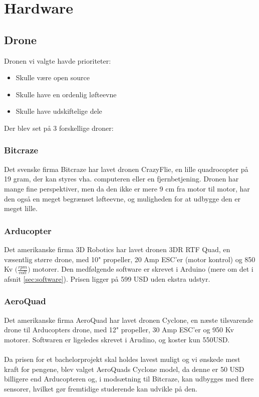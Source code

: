 \documentclass[Main]{subfiles}
\begin{document}
\chapter{Hardware}


\section{Drone}
Dronen vi valgte havde prioriteter:
\begin{itemize}
\item Skulle være open source
\item Skulle have en ordenlig løfteevne
\item Skulle have udskiftelige dele
\end{itemize}

Der blev set på 3 forskellige droner:
\subsection{Bitcraze}
Det svenske firma Bitcraze har lavet dronen CrazyFlie\cite{BitCraze}, en lille quadrocopter på 19 gram, der kan styres vha. computeren eller en fjernbetjening.
Dronen har mange fine perspektiver, men da den ikke er mere 9 cm fra motor til motor, har den også en meget begrænset løfteevne, og muligheden for at udbygge den er meget lille.

\subsection{Arducopter}
Det amerikanske firma 3D Robotics har lavet dronen 3DR RTF Quad\cite{ArduCopter}, en væsentlig større drone, med 10" propeller, 20 Amp ESC'er (motor kontrol) og 850 Kv $\big( \frac{rpm}{volt}\big)$ motorer.
Den medfølgende software er skrevet i Arduino (mere om det i afsnit \ref{sec:software}). 
Prisen ligger på 599 USD uden ekstra udstyr.

\subsection{AeroQuad}
Det amerikanske firma AeroQuad har lavet dronen Cyclone\cite{AQ-store}, en næste tilsvarende drone til Arducopters drone, med 12" propeller, 30 Amp ESC'er og 950 Kv motorer.
Softwaren er ligeledes skrevet i Arudino, og koster kun 550USD.
\\
\\
Da prisen for et bachelorprojekt skal holdes lavest muligt og vi ønskede mest kraft for pengene, blev valget AeroQuads Cyclone model, da denne er 50 USD billigere end Arducopteren og, i modsætning til Bitcraze, kan udbygges med flere sensorer, hvilket gør fremtidige studerende kan udvikle på den.
\end{document}
